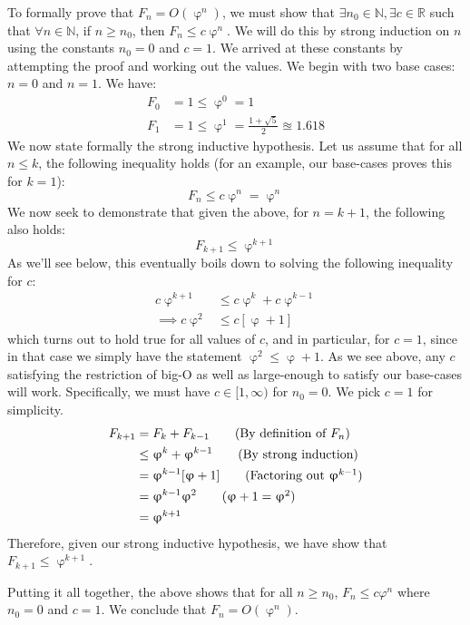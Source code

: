 \documentclass[12pt]{exam}
\newcommand*{\bigo}[1]{O \left( #1 \right)}
\begin{document}
\begin{questions}
\begin{parts}
\begin{solution}
To formally prove that $F_n = \bigo{\upvarphi^n}$, we must show that $\exists n_0 \in \mathbb{N}, \exists c \in \mathbb{R}$ such that $\forall n \in \mathbb{N}$, if $n \geq n_0$, then $F_n \leq c\upvarphi^n$. We will do this by strong induction on $n$ using the constants $n_0 = 0$ and $c = 1$. We arrived at these constants by attempting the proof and working out the values. We begin with two base cases: $n = 0$ and $n = 1$. We have:
\begin{align*}
  F_0 &= 1  \leq \upvarphi^0 = 1 \\
  F_1 &= 1  \leq \upvarphi^1 = \frac{1 + \sqrt{5}}{2} \approxeq 1.618 
\end{align*}
We now state formally the strong inductive hypothesis. Let us assume that for all $n \leq k$, the following inequality holds (for an example, our base-cases proves this for $k = 1$):
$$
F_n \leq c \upvarphi^n = \upvarphi^{n}
$$
We now seek to demonstrate that given the above, for $n = k + 1$, the following also holds:
$$
F_{k+1} \leq \upvarphi^{k+1}
$$
As we'll see below, this eventually boils down to solving the following inequality for $c$:
\begin{align*}
c\upvarphi^{k+1} &\leq c \upvarphi^k + c \upvarphi^{k-1} \\
\implies c\upvarphi^{2} &\leq c[\upvarphi + 1] 
\end{align*}
which turns out to hold true for all values of $c$, and in particular, for $c = 1$, since in that case we simply have the statement $\upvarphi^2 \leq \upvarphi + 1$.
As we see above, any $c$ satisfying the restriction of big-O as well as large-enough to satisfy our base-cases will work. Specifically, we must have $c \in [1, \infty)$ for $n_0 = 0$. We pick $c = 1$ for simplicity.
\begin{align*}
F_{k+1} &= F_{k} + F_{k-1} \tag{By definition of $F_n$} \\
&\leq \upvarphi^{k} +  \upvarphi^{k-1} \tag{By strong induction} \\
&= \upvarphi^{k-1}[\upvarphi + 1] \tag{Factoring out $\upvarphi^{k-1}$} \\
&= \upvarphi^{k-1}\upvarphi^2 \tag{$\upvarphi + 1 = \upvarphi^2$} \\
&= \upvarphi^{k+1}
\end{align*}
Therefore, given our strong inductive hypothesis, we have show that $F_{k+1} \leq \upvarphi^{k+1}$.

Putting it all together, the above shows that for all $n \geq n_0$, $F_{n} \leq c \varphi^{n}$ where $n_0 = 0$ and $c = 1$. We conclude that $F_n = \bigo{\upvarphi^n}$.
\end{solution}


\end{parts}
\end{questions}
\end{document}
